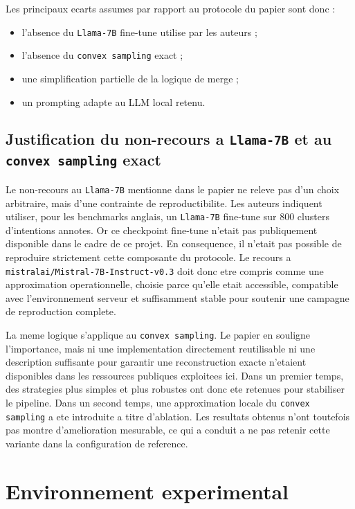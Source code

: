 Les principaux ecarts assumes par rapport au protocole du papier sont donc :
\begin{itemize}[leftmargin=*]
  \item l'absence du \texttt{Llama-7B} fine-tune utilise par les auteurs ;
  \item l'absence du \texttt{convex sampling} exact ;
  \item une simplification partielle de la logique de merge ;
  \item un prompting adapte au LLM local retenu.
\end{itemize}

\subsection{Justification du non-recours a \texttt{Llama-7B} et au \texttt{convex sampling} exact}

Le non-recours au \texttt{Llama-7B} mentionne dans le papier ne releve pas d'un
choix arbitraire, mais d'une contrainte de reproductibilite. Les auteurs
indiquent utiliser, pour les benchmarks anglais, un \texttt{Llama-7B}
fine-tune sur 800 clusters d'intentions annotes. Or ce checkpoint fine-tune
n'etait pas publiquement disponible dans le cadre de ce projet. En
consequence, il n'etait pas possible de reproduire strictement cette
composante du protocole. Le recours a
\texttt{mistralai/Mistral-7B-Instruct-v0.3} doit donc etre compris comme une
approximation operationnelle, choisie parce qu'elle etait accessible,
compatible avec l'environnement serveur et suffisamment stable pour soutenir
une campagne de reproduction complete.

La meme logique s'applique au \texttt{convex sampling}. Le papier en souligne
l'importance, mais ni une implementation directement reutilisable ni une
description suffisante pour garantir une reconstruction exacte n'etaient
disponibles dans les ressources publiques exploitees ici. Dans un premier
temps, des strategies plus simples et plus robustes ont donc ete retenues pour
stabiliser le pipeline. Dans un second temps, une approximation locale du
\texttt{convex sampling} a ete introduite a titre d'ablation. Les resultats
obtenus n'ont toutefois pas montre d'amelioration mesurable, ce qui a conduit
a ne pas retenir cette variante dans la configuration de reference.

\section{Environnement experimental}

